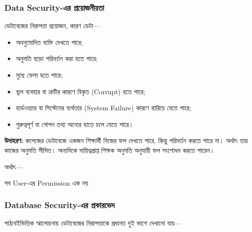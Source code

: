 \subsubsection{Data Security-এর প্রয়োজনীয়তা}

\begin{chSixSideBySide}[.48]
ডেটাবেজের নিরাপত্তা প্রয়োজন, কারণ ডেটা---

\begin{itemize}
    \item অননুমোদিত ব্যক্তি দেখতে পারে;
    \item অনুমতি ছাড়া পরিবর্তন করা হতে পারে;
    \item মুছে ফেলা হতে পারে;
    \item ভুল ব্যবহার বা ত্রুটির কারণে বিকৃত (Corrupt) হতে পারে;
    \item হার্ডওয়্যার বা সিস্টেমের ব্যর্থতার (System Failure) কারণে হারিয়ে যেতে পারে;
    \item গুরুত্বপূর্ণ বা গোপন তথ্য অন্যের হাতে চলে যেতে পারে।
\end{itemize}
\chSixNextColumn
\noindent
\textbf{উদাহরণ:}
কলেজের ডেটাবেজে একজন শিক্ষার্থী নিজের ফল দেখতে পারে, কিন্তু পরিবর্তন করতে পারে না। অর্থাৎ তার কাজের অনুমতি সীমিত। অন্যদিকে দায়িত্বপ্রাপ্ত শিক্ষক অনুমতি অনুযায়ী ফল সংশোধন করতে পারেন।

অর্থাৎ---

\par\smallskip
\noindent\(\displaystyle \boxed{\text{সব User-এর Permission এক নয়}}\)\par\smallskip
\end{chSixSideBySide}

\subsubsection{Database Security-এর প্রকারভেদ}

পাঠ্যবইভিত্তিক আলোচনায় ডেটাবেজের নিরাপত্তাকে প্রধানত দুই ভাগে
দেখানো যায়---

\begin{flushleft}\centering\captionsetup{justification=centering}
\begin{minipage}{0.92\linewidth}
\raggedright
\small



\end{minipage}
\end{flushleft}


